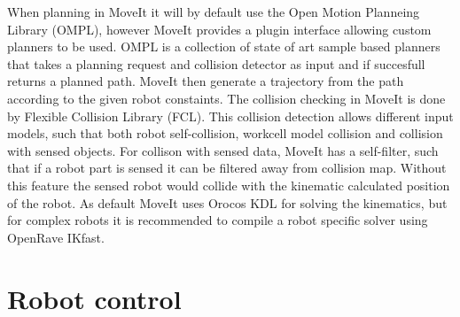 When planning in MoveIt it will by default use the Open Motion Planneing Library (OMPL), however MoveIt provides a plugin interface allowing custom planners to be used. OMPL is a collection of state of art sample based planners that takes a planning request and collision detector as input and if succesfull returns a planned path. MoveIt then generate a trajectory from the path according to the given robot constaints. The collision checking in MoveIt is done by Flexible Collision Library (FCL). This collision detection allows different input models, such that both robot self-collision, workcell model collision and collision with sensed objects. For collison with sensed data, MoveIt has a self-filter, such that if a robot part is sensed it can be filtered away from collision map. Without this feature the sensed robot would collide with the kinematic calculated position of the robot. As default MoveIt uses Orocos KDL for solving the kinematics, but for complex robots it is recommended to compile a robot specific solver using OpenRave IKfast.


\section{Robot control}
\label{sec:robot_control}

%

